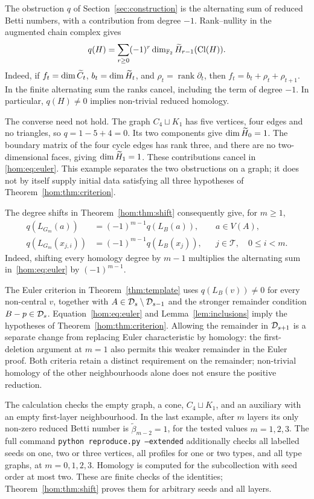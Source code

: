 The obstruction \(q\) of Section~\ref{sec:construction} is the alternating
sum of reduced Betti numbers, with a contribution from degree \(-1\).
Rank--nullity in the augmented chain complex gives
\begin{equation}\label{hom:eq:euler}
 q(H)=\sum_{r\geq0}(-1)^r
       \dim_{\mathbb F_2}\widetilde H_{r-1}(\operatorname{Cl}(H)).
\end{equation}
Indeed, if \(f_t=\dim\widetilde C_t\), \(b_t=\dim\widetilde H_t\), and
\(\rho_t=\operatorname{rank}\partial_t\), then
\(f_t=b_t+\rho_t+\rho_{t+1}\). In the finite alternating sum
the ranks cancel, including the term of degree \(-1\).
In particular, \(q(H)\ne0\) implies non-trivial reduced homology.

The converse need not hold. The graph \(C_4\sqcup K_1\) has five
vertices, four edges and no triangles, so \(q=1-5+4=0\).
Its two components give \(\dim\widetilde H_0=1\). The boundary matrix of
the four cycle edges has rank three, and there are no
two-dimensional faces, giving \(\dim\widetilde H_1=1\).
These contributions cancel in \eqref{hom:eq:euler}.
This example separates the two obstructions on a graph; it does
not by itself supply initial data satisfying all three hypotheses
of Theorem~\ref{hom:thm:criterion}.

The degree shifts in Theorem~\ref{hom:thm:shift} consequently give, for
$m\geq1$,
\begin{equation}\label{hom:eq:sign}
\begin{aligned}
 q(L_{G_m}(a))&=(-1)^{m-1}q(L_B(a)), &&a\in V(A),\\
 q(L_{G_m}(x_{j,i}))&=(-1)^{m-1}q(L_B(x_j)),
 &&j\in\mathcal T,\quad 0\leq i<m.
\end{aligned}
\end{equation}
Indeed, shifting every homology degree by $m-1$ multiplies the alternating
sum in~\eqref{hom:eq:euler} by $(-1)^{m-1}$.

The Euler criterion in Theorem~\ref{thm:template} uses
\(q(L_B(v))\ne0\) for every non-central \(v\), together with
\(A\in\mathcal D_s\setminus\mathcal D_{s-1}\) and the stronger remainder condition
\(B-p\in\mathcal D_s\). Equation~\eqref{hom:eq:euler} and
Lemma~\ref{lem:inclusions} imply the hypotheses of Theorem~\ref{hom:thm:criterion}.
Allowing the remainder in \(\mathcal D_{s+1}\) is a separate change from
replacing Euler characteristic by homology: the first-deletion
argument at \(m=1\) also permits this weaker remainder in the
Euler proof. Both criteria retain a distinct requirement on the
remainder; non-trivial homology of the other neighbourhoods alone
does not ensure the positive reduction.


The calculation checks the empty graph, a cone, $C_4\sqcup K_1$, and an
auxiliary with an empty first-layer neighbourhood. In the last example,
after $m$ layers its only non-zero reduced Betti number is $\widetilde\beta_{m-2}=1$,
for the tested values $m=1,2,3$. The full command
\texttt{python reproduce.py --extended} additionally checks all labelled
seeds on one, two or three vertices, all profiles for one or two types,
and all type graphs, at $m=0,1,2,3$. Homology is computed for the subcollection
with seed order at most two. These are finite checks of the identities;
Theorem~\ref{hom:thm:shift} proves them for arbitrary seeds and all layers.
